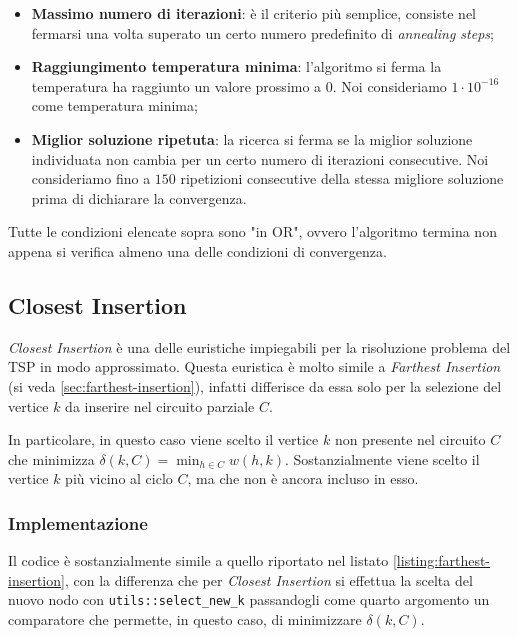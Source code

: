 \begin{itemize}
    \item \textbf{Massimo numero di iterazioni}: è il criterio più semplice, consiste nel fermarsi una volta superato un certo numero predefinito di \textit{annealing steps};
    \item \textbf{Raggiungimento temperatura minima}: l'algoritmo si ferma la temperatura ha raggiunto un valore prossimo a 0. Noi consideriamo $1 \cdot 10^{-16}$ come temperatura minima;
    \item \textbf{Miglior soluzione ripetuta}: la ricerca si ferma se la miglior soluzione individuata non cambia per un certo numero di iterazioni consecutive. Noi consideriamo fino a $150$ ripetizioni consecutive della stessa migliore soluzione prima di dichiarare la convergenza.
\end{itemize}

\noindent Tutte le condizioni elencate sopra sono "in OR", ovvero l'algoritmo termina non appena si verifica almeno una delle condizioni di convergenza.

\subsection{Closest Insertion}
\label{sec:closest-insertion}

\emph{Closest Insertion} è una delle euristiche impiegabili per la
risoluzione problema del TSP in modo approssimato. Questa euristica
è molto simile a \emph{Farthest Insertion} (si veda \ref{sec:farthest-insertion}),
infatti differisce da essa solo per la selezione del vertice $k$
da inserire nel circuito parziale $C$.

In particolare, in questo caso viene scelto il vertice $k$ non presente
nel circuito $C$ che minimizza $\delta (k, C) = \min_{h \in C} w(h, k)$.
Sostanzialmente viene scelto il vertice $k$ più vicino al ciclo $C$,
ma che non è ancora incluso in esso.

\subsubsection{Implementazione}

Il codice è sostanzialmente simile a quello riportato nel listato
\ref{listing:farthest-insertion}, con la differenza che per
\emph{Closest Insertion} si effettua la scelta del nuovo nodo
con \texttt{utils::select_new_k} passandogli come quarto
argomento un comparatore che permette, in questo caso, di
minimizzare $\delta (k, C)$.

